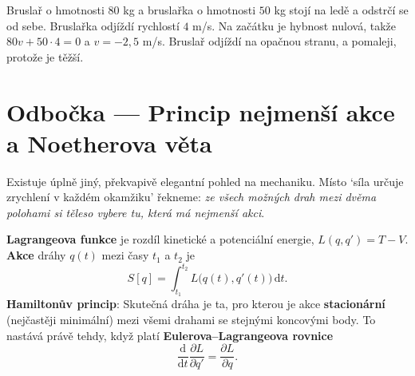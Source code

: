 \begin{example}
  Bruslař o hmotnosti $80$ kg a bruslařka o hmotnosti $50$ kg stojí na ledě a odstrčí se od sebe. Bruslařka odjíždí rychlostí $4$ m/s. Na začátku je hybnost nulová, takže $80v + 50\cdot 4 = 0$ a $v = -2{,}5$ m/s. Bruslař odjíždí na opačnou stranu, a pomaleji, protože je těžší.
\end{example}

\section{Odbočka --- Princip nejmenší akce a Noetherova věta}

Existuje úplně jiný, překvapivě elegantní pohled na mechaniku. Místo `síla určuje zrychlení v každém okamžiku' řekneme: \textit{ze všech možných drah mezi dvěma polohami si těleso vybere tu, která má nejmenší akci}.

\begin{definitionbox}
  \textbf{Lagrangeova funkce} je rozdíl kinetické a potenciální energie, $L(q, q') = T - V$. \textbf{Akce} dráhy $q(t)$ mezi časy $t_1$ a $t_2$ je
  \begin{equation*}
    S[q] = \int_{t_1}^{t_2}L\big(q(t), q'(t)\big)\,\mathrm{d}t.
  \end{equation*}
  \textbf{Hamiltonův princip}: Skutečná dráha je ta, pro kterou je akce \textbf{stacionární} (nejčastěji minimální) mezi všemi drahami se stejnými koncovými body. To nastává právě tehdy, když platí \textbf{Eulerova--Lagrangeova rovnice}
  \begin{equation*}
    \frac{\mathrm{d}}{\mathrm{d}t}\frac{\partial L}{\partial q'} = \frac{\partial L}{\partial q}.
  \end{equation*}
\end{definitionbox}

\begin{center}
\end{center}

